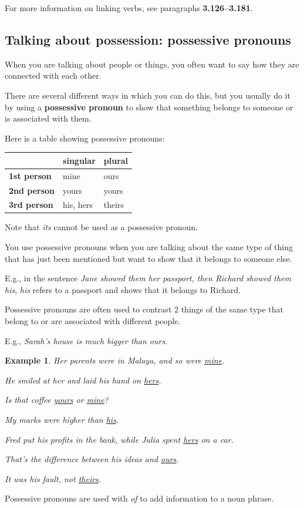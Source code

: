 \documentclass[oneside]{book}
\numberwithin{equation}{section}
\newtheorem{example}{Example}[section]
\begin{document}
%
For more information on linking verbs, see paragraphs \textbf{3.126--3.181}.

\subsection{Talking about possession: possessive pronouns}
\noindent{} When you are talking about people or things, you often want to say how they are connected with each other.

There are several different ways in which you can do this, but you usually do it by using a \textbf{possessive pronoun} to show that something belongs to someone or is associated with them.

%
Here is a table showing possessive pronouns:
\begin{table}[H]
    \centering
    \begin{tabular}{|l|l|l|}
        \hline
        & \textbf{singular} & \textbf{plural} \\
        \hline
        \textbf{1st person} & mine & ours \\
        \hline
        \textbf{2nd person} & yours & yours \\
        \hline
        \textbf{3rd person} & his, hers & theirs \\
        \hline
    \end{tabular}
\end{table}
Note that \textit{its} cannot be used as a possessive pronoun.

%
\noindent{} You use possessive pronouns when you are talking about the same type of thing that has just been mentioned but want to show that it belongs to someone else.

%
E.g., in the sentence \textit{Jane showed them her passport, then Richard showed them his}, \textit{his} refers to a passport and shows that it belongs to Richard.

%
Possessive pronouns are often used to contrast 2 things of the same type that belong to or are associated with different people.

E.g., \textit{Sarah's house is much bigger than ours}.
\begin{example}
    Her parents were in Malaya, and so were \underline{mine}.
    
    He smiled at her and laid his hand on \underline{hers}.
    
    Is that coffee \underline{yours} or \underline{mine}?
    
    My marks were higher than \underline{his}.
    
    Fred put his profits in the bank, while Julia spent \underline{hers} on a car.
    
    That's the difference between his ideas and \underline{ours}.
    
    It was his fault, not \underline{theirs}.
\end{example}
%
\noindent{} Possessive pronouns are used with \textit{of} to add information to a noun phrase.
\end{document}
